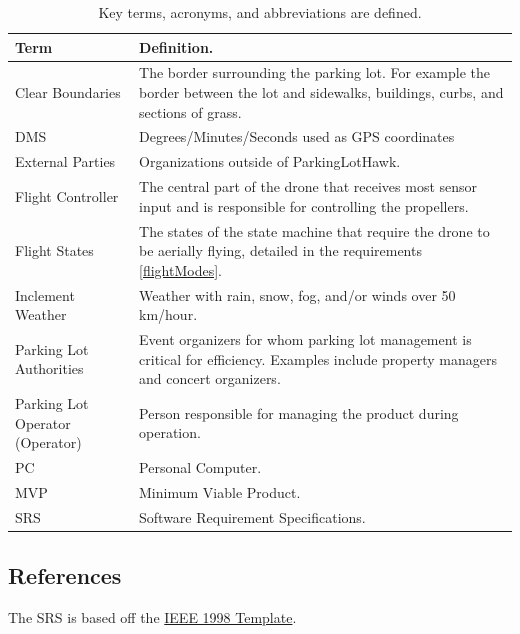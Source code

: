 \documentclass{article}
\begin{document}
\begin{table}[!h]
\begin{center}
\caption {Key terms, acronyms, and abbreviations are defined.} 
\label{DefTable}
\begin{tabular}{ | m{3cm} | m{11cm} | }
\hline
Term & Definition. \\
\hline
Clear Boundaries & The border surrounding the parking lot. For example the border between the lot and sidewalks, buildings, curbs, and sections of grass.\\
\hline
DMS & Degrees/Minutes/Seconds used as GPS coordinates\\
\hline
External Parties & Organizations outside of ParkingLotHawk. \\
\hline
Flight Controller & The central part of the drone that receives most sensor input and is responsible for controlling the propellers.\\
\hline
Flight States & The states of the state machine that require the drone to be aerially flying, detailed in the requirements \ref{flightModes}.\\
\hline
Inclement Weather & Weather with rain, snow, fog, and/or winds over 50 km/hour. \\
\hline
Parking Lot Authorities & Event organizers for whom parking lot management is critical for efficiency. Examples include property managers and concert organizers.  \\
\hline
Parking Lot Operator (Operator) & Person responsible for managing the product during operation. \\
\hline
PC & Personal Computer. \\
\hline
MVP & Minimum Viable Product. \\
\hline
SRS & Software Requirement Specifications. \\
\hline
\end{tabular}
\end{center}
\end{table}

\subsection{References}
The SRS is based off the \href{https://github.com/icecap360/DroneCapstone/blob/master/refs/IEEE1998.pdf}{IEEE 1998 Template}. 
\end{document}
